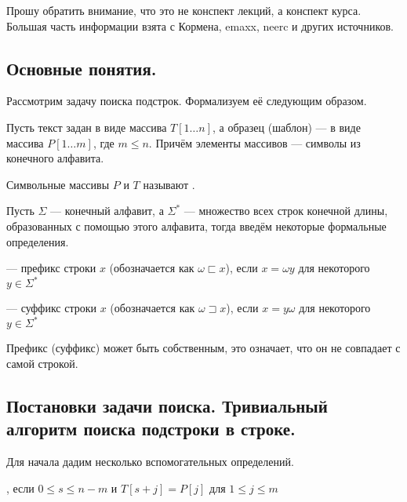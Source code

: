 \begin{tcolorbox}[sharp corners, colback=white, colframe=white!60!black, title=Важно!]
  Прошу обратить внимание, что это не конспект лекций, а конспект курса. Большая часть информации
  взята с Кормена, emaxx, neerc и других источников.
\end{tcolorbox}

\subsection{Основные понятия.}

Рассмотрим задачу поиска подстрок. Формализуем её следующим образом.
\begin{remark}
	Пусть текст задан в виде массива $T[1 \ldots n]$, а образец (шаблон) --- в виде массива
	$P[1 \ldots m]$, где $m \leq n$. Причём элементы массивов --- символы из конечного алфавита. 
\end{remark}

\begin{definition}
Символьные массивы $P$ и $T$ называют .
\end{definition}

Пусть $\Sigma$ --- конечный алфавит, а $\Sigma^{*}$ --- множество всех строк конечной длины, образованных
с помощью этого алфавита, тогда введём некоторые формальные определения.

\begin{definition}
	\highlight{$\omega$} --- префикс строки $x$ (обозначается как $ \omega \sqsubset x$), если $x = \omega y$
	для некоторого $y \in \Sigma^{*}$ 
\end{definition}

\begin{definition}
	\highlight{$ \omega$} --- суффикс строки $x$ (обозначается как $ \omega \sqsupset x$), если $x = y \omega $
	для некоторого $y \in \Sigma^{*}$ 
\end{definition}

\begin{remark}
	Префикс (суффикс) может быть собственным, это означает, что он не совпадает с самой строкой.
\end{remark}

\subsection{Постановки задачи поиска. Тривиальный алгоритм поиска подстроки в строке.}
Для начала дадим несколько вспомогательных определений.
\begin{definition}
	, если $0 \leq s \leq n - m$ и $T[s + j] = P[j]$ 
	 для $1 \leq j \leq m$
\end{definition}

